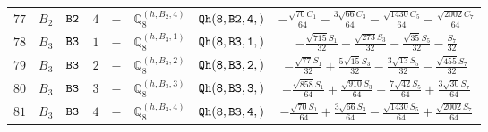 \documentclass[fleqn,8pt]{jsarticle}
\begin{document}
\begin{table}[ht!]
\begin{center}
\begin{tabular}{cccccccc}
$ 77 $ & $ B_{2} $ & $ {\tt B2} $ & $ 4 $ & $ - $ & $ \mathbb{Q}_{8}^{(h,B_{2},4)} $ & $ {\tt Qh(8,B2,4,)} $ & $ - \frac{\sqrt{70} C_{1}}{64} - \frac{3 \sqrt{66} C_{3}}{64} - \frac{\sqrt{1430} C_{5}}{64} - \frac{\sqrt{2002} C_{7}}{64} $ \\
$ 78 $ & $ B_{3} $ & $ {\tt B3} $ & $ 1 $ & $ - $ & $ \mathbb{Q}_{8}^{(h,B_{3},1)} $ & $ {\tt Qh(8,B3,1,)} $ & $ - \frac{\sqrt{715} S_{1}}{32} - \frac{\sqrt{273} S_{3}}{32} - \frac{\sqrt{35} S_{5}}{32} - \frac{S_{7}}{32} $ \\
$ 79 $ & $ B_{3} $ & $ {\tt B3} $ & $ 2 $ & $ - $ & $ \mathbb{Q}_{8}^{(h,B_{3},2)} $ & $ {\tt Qh(8,B3,2,)} $ & $ - \frac{\sqrt{77} S_{1}}{32} + \frac{5 \sqrt{15} S_{3}}{32} - \frac{3 \sqrt{13} S_{5}}{32} - \frac{\sqrt{455} S_{7}}{32} $ \\
$ 80 $ & $ B_{3} $ & $ {\tt B3} $ & $ 3 $ & $ - $ & $ \mathbb{Q}_{8}^{(h,B_{3},3)} $ & $ {\tt Qh(8,B3,3,)} $ & $ - \frac{\sqrt{858} S_{1}}{64} + \frac{\sqrt{910} S_{3}}{64} + \frac{7 \sqrt{42} S_{5}}{64} + \frac{3 \sqrt{30} S_{7}}{64} $ \\
$ 81 $ & $ B_{3} $ & $ {\tt B3} $ & $ 4 $ & $ - $ & $ \mathbb{Q}_{8}^{(h,B_{3},4)} $ & $ {\tt Qh(8,B3,4,)} $ & $ - \frac{\sqrt{70} S_{1}}{64} + \frac{3 \sqrt{66} S_{3}}{64} - \frac{\sqrt{1430} S_{5}}{64} + \frac{\sqrt{2002} S_{7}}{64} $ \\
 \hline \hline
\end{tabular}
\end{center}
\end{table}
\end{document}
